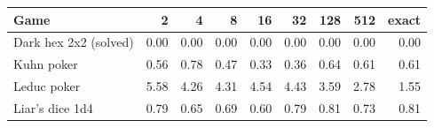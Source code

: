 \begin{tabular}{l r r r r r r r r}
\toprule
Game & 2 & 4 & 8 & 16 & 32 & 128 & 512 & exact \\
\midrule
Dark hex 2x2 (solved) & 0.00 & 0.00 & 0.00 & 0.00 & 0.00 & 0.00 & 0.00 & 0.00 \\
Kuhn poker & 0.56 & 0.78 & 0.47 & 0.33 & 0.36 & 0.64 & 0.61 & 0.61 \\
Leduc poker & 5.58 & 4.26 & 4.31 & 4.54 & 4.43 & 3.59 & 2.78 & 1.55 \\
Liar's dice 1d4 & 0.79 & 0.65 & 0.69 & 0.60 & 0.79 & 0.81 & 0.73 & 0.81 \\
\bottomrule
\end{tabular}
